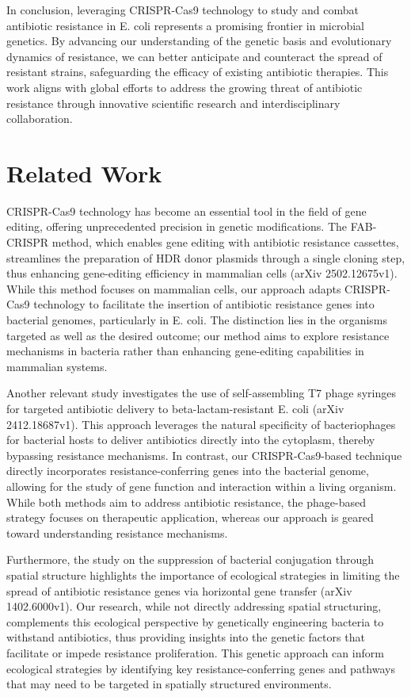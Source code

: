 \documentclass{article}
\begin{document}
In conclusion, leveraging CRISPR-Cas9 technology to study and combat antibiotic resistance in E. coli represents a promising frontier in microbial genetics. By advancing our understanding of the genetic basis and evolutionary dynamics of resistance, we can better anticipate and counteract the spread of resistant strains, safeguarding the efficacy of existing antibiotic therapies. This work aligns with global efforts to address the growing threat of antibiotic resistance through innovative scientific research and interdisciplinary collaboration.

\section{Related Work}
CRISPR-Cas9 technology has become an essential tool in the field of gene editing, offering unprecedented precision in genetic modifications. The FAB-CRISPR method, which enables gene editing with antibiotic resistance cassettes, streamlines the preparation of HDR donor plasmids through a single cloning step, thus enhancing gene-editing efficiency in mammalian cells (arXiv 2502.12675v1). While this method focuses on mammalian cells, our approach adapts CRISPR-Cas9 technology to facilitate the insertion of antibiotic resistance genes into bacterial genomes, particularly in E. coli. The distinction lies in the organisms targeted as well as the desired outcome; our method aims to explore resistance mechanisms in bacteria rather than enhancing gene-editing capabilities in mammalian systems.

Another relevant study investigates the use of self-assembling T7 phage syringes for targeted antibiotic delivery to beta-lactam-resistant E. coli (arXiv 2412.18687v1). This approach leverages the natural specificity of bacteriophages for bacterial hosts to deliver antibiotics directly into the cytoplasm, thereby bypassing resistance mechanisms. In contrast, our CRISPR-Cas9-based technique directly incorporates resistance-conferring genes into the bacterial genome, allowing for the study of gene function and interaction within a living organism. While both methods aim to address antibiotic resistance, the phage-based strategy focuses on therapeutic application, whereas our approach is geared toward understanding resistance mechanisms.

Furthermore, the study on the suppression of bacterial conjugation through spatial structure highlights the importance of ecological strategies in limiting the spread of antibiotic resistance genes via horizontal gene transfer (arXiv 1402.6000v1). Our research, while not directly addressing spatial structuring, complements this ecological perspective by genetically engineering bacteria to withstand antibiotics, thus providing insights into the genetic factors that facilitate or impede resistance proliferation. This genetic approach can inform ecological strategies by identifying key resistance-conferring genes and pathways that may need to be targeted in spatially structured environments.
\end{document}
